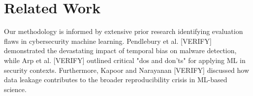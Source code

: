 \section{Related Work}
Our methodology is informed by extensive prior research identifying evaluation flaws in cybersecurity machine learning. Pendlebury et al. \cite{pendlebury2019} [VERIFY] demonstrated the devastating impact of temporal bias on malware detection, while Arp et al. \cite{arp2022} [VERIFY] outlined critical "dos and don'ts" for applying ML in security contexts. Furthermore, Kapoor and Narayanan \cite{kapoor2023} [VERIFY] discussed how data leakage contributes to the broader reproducibility crisis in ML-based science.
